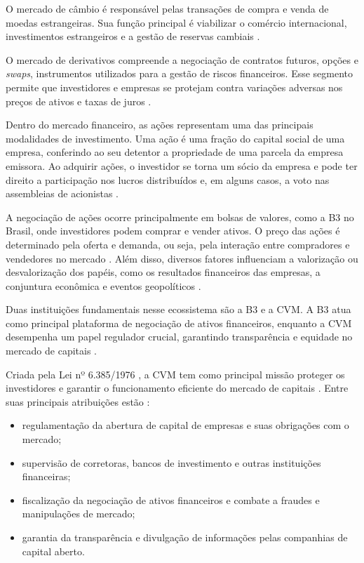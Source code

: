 O mercado de câmbio é responsável pelas transações de compra e venda de moedas estrangeiras. Sua função principal é viabilizar o comércio internacional, investimentos estrangeiros e a gestão de reservas cambiais \cite{gois:2019:efeito}.

O mercado de derivativos compreende a negociação de contratos futuros, opções e \textit{swaps}, instrumentos utilizados para a gestão de riscos financeiros. Esse segmento permite que investidores e empresas se protejam contra variações adversas nos preços de ativos e taxas de juros \cite{figueiredo:2023:capacidade}.

Dentro do mercado financeiro, as ações representam uma das principais modalidades de investimento. Uma ação é uma fração do capital social de uma empresa, conferindo ao seu detentor a propriedade de uma parcela da empresa emissora. Ao adquirir ações, o investidor se torna um sócio da empresa e pode ter direito a participação nos lucros distribuídos e, em alguns casos, a voto nas assembleias de acionistas \cite{reis:2021:negociacao, gomes:2007:bolsa}.

A negociação de ações ocorre principalmente em bolsas de valores, como a B3 no Brasil, onde investidores podem comprar e vender ativos. O preço das ações é determinado pela oferta e demanda, ou seja, pela interação entre compradores e vendedores no mercado \cite{santander:2024:pregao}. Além disso, diversos fatores influenciam a valorização ou desvalorização dos papéis, como os resultados financeiros das empresas, a conjuntura econômica e eventos geopolíticos \cite{damodaran:2012:investimentos, attie:2013:bolsa}.

Duas instituições fundamentais nesse ecossistema são a B3 e a CVM. A B3 atua como principal plataforma de negociação de ativos financeiros, enquanto a CVM desempenha um papel regulador crucial, garantindo transparência e equidade no mercado de capitais \cite{cvm:2023:funcoes}.

Criada pela Lei nº 6.385/1976 \cite{brasil:1976:lei6385}, a CVM tem como principal missão proteger os investidores e garantir o funcionamento eficiente do mercado de capitais \cite{cvm:2009:informacao}. Entre suas principais atribuições estão \cite{cvm:2009:informacao, roberto:2023:papel}:

\begin{itemize}
	\item regulamentação da abertura de capital de empresas e suas obrigações com o mercado;
	\item supervisão de corretoras, bancos de investimento e outras instituições financeiras;
	\item fiscalização da negociação de ativos financeiros e combate a fraudes e manipulações de mercado;
	\item garantia da transparência e divulgação de informações pelas companhias de capital aberto.
\end{itemize}

